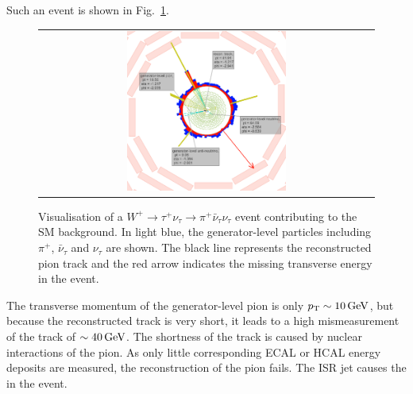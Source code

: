Such an event is shown in Fig.~\ref{fig:LostTau}.  
\begin{figure}[!tb]
  \centering 
  \begin{tabular}{c}
    \includegraphics[width=0.49\textwidth]{figures/analysis/Background/LostTau_lumi_20940_event_8369426.png}
  \end{tabular}
  \caption{Visualisation of a $W^{+}\rightarrow \tau^{+}\nu_{\tau} \rightarrow \pi^{+}\bar{\nu}_{\tau} \nu_{\tau} $ event contributing to the SM background. 
           In light blue, the generator-level particles including $\pi^{+}$, $\bar{\nu}_{\tau}$ and $\nu_{\tau}$ are shown.
           The black line represents the reconstructed pion track and the red arrow indicates the missing transverse energy in the event.}
  \label{fig:LostTau}
\end{figure}
The transverse momentum of the generator-level pion is only $p_{\text{T}}\sim10\,\text{Ge}\kern-0.06667em\text{V}$, but because the reconstructed track is very short, it leads to a high mismeasurement of the track \pt of $\sim40\,\text{Ge}\kern-0.06667em\text{V}$.
The shortness of the track is caused by nuclear interactions of the pion.
As only little corresponding ECAL or HCAL energy deposits are measured, the reconstruction of the pion fails.
The ISR jet causes the \met in the event.


